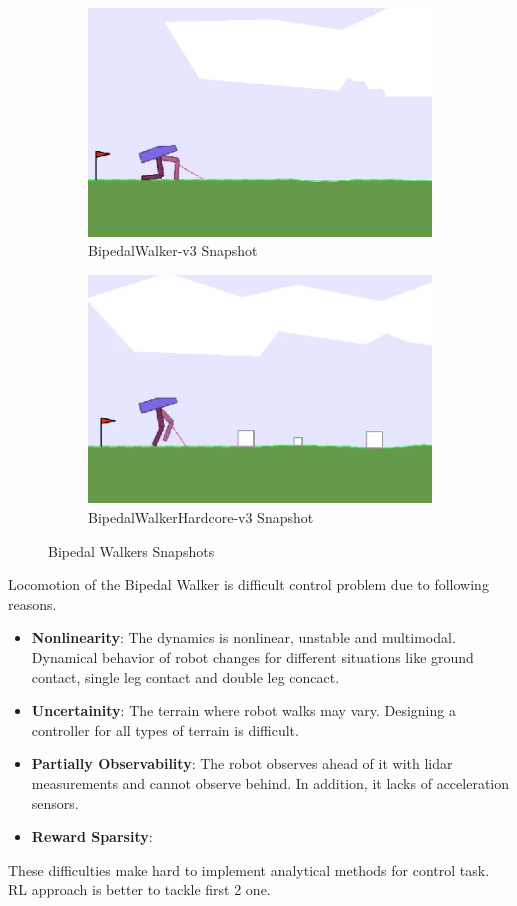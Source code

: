 \begin{figure}
	\begin{subfigure}{.5\textwidth}
		\centering
		\includegraphics[width=0.9\linewidth]{figures/bipedal/classic.png}
		\caption{BipedalWalker-v3 Snapshot}
		\label{fig:bipedal_walker_classic}
	\end{subfigure}
	\begin{subfigure}{.5\textwidth}
		\centering
		\includegraphics[width=0.9\linewidth]{figures/bipedal/hardcore.png}
		\caption{BipedalWalkerHardcore-v3 Snapshot}
		\label{fig:bipedal_walker_hardcore}
	\end{subfigure}
	\caption{Bipedal Walkers Snapshots}
	\label{fig:bipedal_walkers}
\end{figure}

Locomotion of the Bipedal Walker is difficult control problem due to following reasons. 
\begin{itemize}
	\item \textbf{Nonlinearity}: The dynamics is nonlinear, unstable and multimodal. 
	Dynamical behavior of robot changes for different situations 
	like ground contact, single leg contact and double leg concact. 
	\item \textbf{Uncertainity}: The terrain where robot walks may vary. 
	Designing a controller for all types of terrain is difficult.
	\item \textbf{Partially Observability}: The robot observes 
	ahead of it with lidar measurements and cannot observe behind. 
	In addition, it lacks of acceleration sensors.
	\item \textbf{Reward Sparsity}: 
\end{itemize}
These difficulties make hard to implement analytical methods for control task. 
RL approach is better to tackle first 2 one. 

